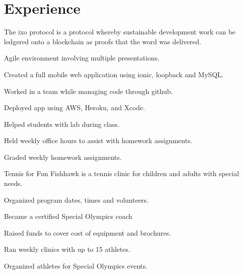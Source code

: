 \documentclass[]{deedy-resume-openfont}
\begin{document}
\begin{minipage}[t]{0.66\textwidth} 


\section{Experience}

\vspace{\topsep} %
\begin{tightemize}\item The ixo protocol is a protocol whereby sustainable development work can be ledgered onto a blockchain as proofs that the word was delivered. 
\end{tightemize}
\sectionsep

\begin{tightemize}
\item Agile environment involving multiple presentations. \item Created a full mobile web application using ionic, loopback and MySQL. \item Worked in a team while managing code through github.  \item Deployed app using AWS, Heroku, and Xcode.\end{tightemize}
\sectionsep

\begin{tightemize}
\item Helped students with lab during class. \item Held weekly office hours to assist with homework assignments. \item Graded weekly homework assignments.
\end{tightemize}
\sectionsep

\begin{tightemize}
\item 	Tennis for Fun Fishhawk is a tennis clinic for children and adults with special needs.\item 	Organized program dates, times and volunteers. \item Became a certified Special Olympics coach \item	Raised funds to cover cost of equipment and brochures. \item  Ran weekly clinics with up to 15 athletes. \item Organized athletes for Special Olympics events.  \end{tightemize}
\sectionsep




\end{minipage}
\end{document}
